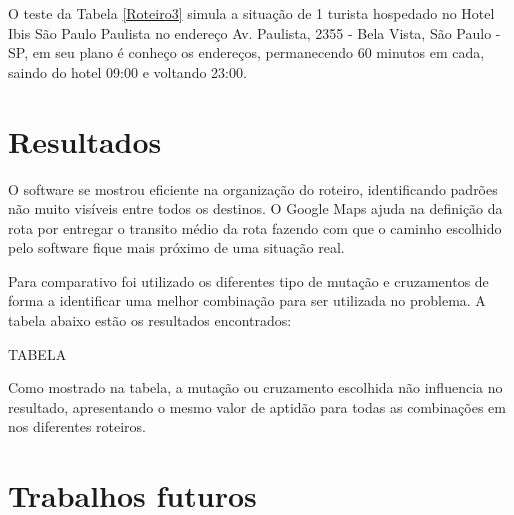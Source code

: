 O teste da Tabela \ref{Roteiro3} simula a situação de 1 turista hospedado no Hotel Ibis São Paulo Paulista no endereço Av. Paulista, 2355 - Bela Vista, São Paulo - SP, em seu plano é conheço os endereços, permanecendo 60 minutos em cada, saindo do hotel 09:00 e voltando 23:00.

\section{Resultados}

O software se mostrou eficiente na organização do roteiro, identificando padrões não muito visíveis entre todos os destinos. O Google Maps ajuda na definição da rota por entregar o transito médio da rota fazendo com que o caminho escolhido pelo software fique mais próximo de uma situação real.

Para comparativo foi utilizado os diferentes tipo de mutação e cruzamentos de forma a identificar uma melhor combinação para ser utilizada no problema. A tabela abaixo estão os resultados encontrados:


TABELA


Como mostrado na tabela, a mutação ou cruzamento escolhida não influencia no resultado, apresentando o mesmo valor de aptidão para todas as combinações em nos diferentes roteiros.



 

\section{Trabalhos futuros}
